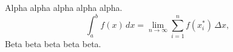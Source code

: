 \documentclass[12pt]{article}
\begin{document}
Alpha alpha alpha alpha alpha.
\[
  \int_a^b f(x)\, dx = \lim_{n \to \infty} \sum_{i=1}^{n} f(x_i^*) \, \Delta x,
\]
Beta beta beta beta beta.
\end{document}
